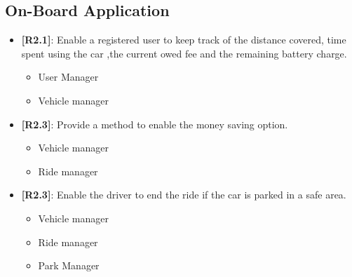 \subsection{On-Board Application}
\begin{itemize}
	\item{\textbf{[R2.1]}}: Enable a registered user to keep track of the distance covered, time spent using the car ,the current owed fee and the remaining battery charge.\\
	\begin{itemize}
	\item User Manager
	\item Vehicle manager
	\end{itemize}
	\item{\textbf{[R2.3]}}: Provide a method to enable the money saving option.\\
	\begin{itemize}
	\item Vehicle manager
	\item Ride manager
	\end{itemize}
	\item{\textbf{[R2.3]}}: Enable the driver to end the ride if the car is parked in a safe area.\\
	\begin{itemize}
	\item Vehicle manager
	\item Ride manager
	\item Park Manager
	\end{itemize}
 \end{itemize}
 	 	